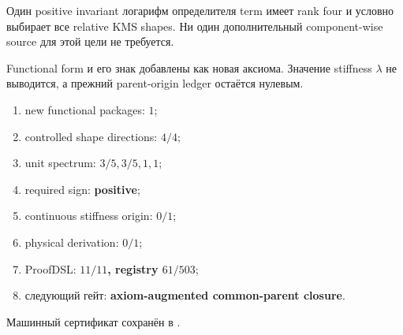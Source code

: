 \begin{theorem}
Один positive invariant логарифм определителя term имеет rank four и условно выбирает все
relative KMS shapes. Ни один дополнительный component-wise source для этой
цели не требуется.
\end{theorem}

\begin{nogocriterion}
Functional form и его знак добавлены как новая аксиома. Значение stiffness
$\lambda$ не выводится, а прежний parent-origin ledger остаётся нулевым.
\end{nogocriterion}

\begin{protocol}\begin{enumerate}
\item new functional packages: \textbf{$1$};
\item controlled shape directions: \textbf{$4/4$};
\item unit spectrum: \textbf{$3/5,3/5,1,1$};
\item required sign: \textbf{positive};
\item continuous stiffness origin: \textbf{$0/1$};
\item physical derivation: \textbf{$0/1$};
\item ProofDSL: \textbf{$11/11$, registry $61/503$};
\item следующий гейт: \textbf{axiom-augmented common-parent closure}.
\end{enumerate}\end{protocol}

Машинный сертификат сохранён в
.